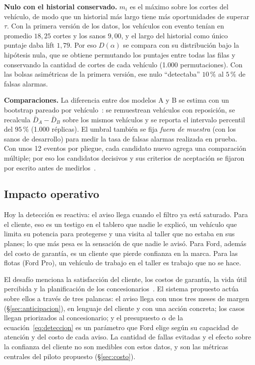 \textbf{Nulo con el historial conservado.} $m_i$ es el máximo sobre los cortes del vehículo, de modo que un historial más
largo tiene más oportunidades de superar $\tau$. Con la primera versión de los datos, los vehículos con evento tenían en promedio
$18{,}25$ cortes y los sanos $9{,}00$, y el largo del historial como único puntaje daba lift $1{,}79$. Por eso $D(\alpha)$ se
compara con su distribución bajo la hipótesis nula, que se obtiene permutando los puntajes entre todas las filas y conservando
la cantidad de cortes de cada vehículo (1.000 permutaciones). Con las bolsas asimétricas de la primera versión, ese nulo
``detectaba'' $10\,\%$ al $5\,\%$ de falsas alarmas.

\textbf{Comparaciones.} La diferencia entre dos modelos A y B se estima con un bootstrap pareado por
vehículo~\cite{efron1993}: se remuestrean vehículos con reposición, se recalcula $\bar D_A - \bar D_B$ sobre los mismos
vehículos y se reporta el intervalo percentil del $95\,\%$ (1.000 réplicas). El umbral también se fija \emph{fuera de
muestra} (con los sanos de desarrollo) para medir la tasa de falsas alarmas realizada en prueba. Con unos 12 eventos por
pliegue, cada candidato nuevo agrega una comparación múltiple; por eso los candidatos decisivos y sus criterios de
aceptación se fijaron por escrito antes de medirlos~\cite{nosek2018}.

\subsection{Impacto operativo}

Hoy la detección es reactiva: el aviso llega cuando el filtro ya está saturado. Para el cliente, eso es un testigo en el
tablero que nadie le explicó, un vehículo que limita su potencia para protegerse y una visita al taller que no estaba en sus
planes; lo que más pesa es la sensación de que nadie le avisó. Para Ford, además del costo de garantía, es un cliente que
pierde confianza en la marca. Para las flotas (Ford Pro), un vehículo de trabajo en el taller es trabajo que no se hace.

El desafío menciona la satisfacción del cliente, los costos de garantía, la vida útil percibida y la planificación de los
concesionarios~\cite{ford}. El sistema propuesto actúa sobre ellos a través de tres palancas: el aviso llega con unos tres
meses de margen (\S\ref{sec:anticipacion}), en lenguaje del cliente y con una acción concreta; los casos llegan priorizados
al concesionario; y el presupuesto $\alpha$ de la ecuación~\eqref{eq:deteccion} es un parámetro que Ford elige según su
capacidad de atención y del costo de cada aviso. La cantidad de fallas evitadas y el efecto sobre la confianza del cliente
no son medibles con estos datos, y son las métricas centrales del piloto propuesto (\S\ref{sec:costo}).

